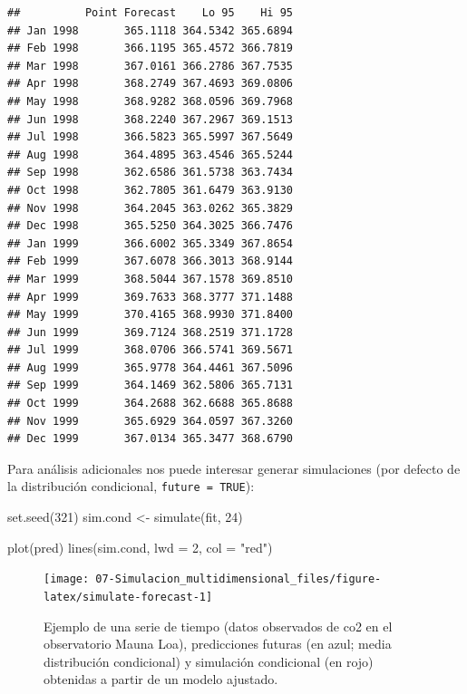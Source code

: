 \documentclass[
]{book}
\newenvironment{Shaded}{\begin{snugshade}}{\end{snugshade}}
\newcommand{\AttributeTok}[1]{\textcolor[rgb]{0.77,0.63,0.00}{#1}}
\newcommand{\DecValTok}[1]{\textcolor[rgb]{0.00,0.00,0.81}{#1}}
\newcommand{\FunctionTok}[1]{\textcolor[rgb]{0.00,0.00,0.00}{#1}}
\newcommand{\NormalTok}[1]{#1}
\newcommand{\OtherTok}[1]{\textcolor[rgb]{0.56,0.35,0.01}{#1}}
\newcommand{\StringTok}[1]{\textcolor[rgb]{0.31,0.60,0.02}{#1}}
\theoremstyle{break}
\theoremstyle{definition}
\theoremstyle{definition}
\theoremstyle{definition}
\theoremstyle{definition}
\theoremstyle{remark}
\begin{document}
\begin{verbatim}
##          Point Forecast    Lo 95    Hi 95
## Jan 1998       365.1118 364.5342 365.6894
## Feb 1998       366.1195 365.4572 366.7819
## Mar 1998       367.0161 366.2786 367.7535
## Apr 1998       368.2749 367.4693 369.0806
## May 1998       368.9282 368.0596 369.7968
## Jun 1998       368.2240 367.2967 369.1513
## Jul 1998       366.5823 365.5997 367.5649
## Aug 1998       364.4895 363.4546 365.5244
## Sep 1998       362.6586 361.5738 363.7434
## Oct 1998       362.7805 361.6479 363.9130
## Nov 1998       364.2045 363.0262 365.3829
## Dec 1998       365.5250 364.3025 366.7476
## Jan 1999       366.6002 365.3349 367.8654
## Feb 1999       367.6078 366.3013 368.9144
## Mar 1999       368.5044 367.1578 369.8510
## Apr 1999       369.7633 368.3777 371.1488
## May 1999       370.4165 368.9930 371.8400
## Jun 1999       369.7124 368.2519 371.1728
## Jul 1999       368.0706 366.5741 369.5671
## Aug 1999       365.9778 364.4461 367.5096
## Sep 1999       364.1469 362.5806 365.7131
## Oct 1999       364.2688 362.6688 365.8688
## Nov 1999       365.6929 364.0597 367.3260
## Dec 1999       367.0134 365.3477 368.6790
\end{verbatim}

Para análisis adicionales nos puede interesar generar simulaciones (por defecto de la distribución condicional, \texttt{future\ =\ TRUE}):

\begin{Shaded}
\begin{Highlighting}[]
\FunctionTok{set.seed}\NormalTok{(}\DecValTok{321}\NormalTok{)}
\NormalTok{sim.cond }\OtherTok{\textless{}{-}} \FunctionTok{simulate}\NormalTok{(fit, }\DecValTok{24}\NormalTok{)}

\FunctionTok{plot}\NormalTok{(pred)}
\FunctionTok{lines}\NormalTok{(sim.cond, }\AttributeTok{lwd =} \DecValTok{2}\NormalTok{, }\AttributeTok{col =} \StringTok{"red"}\NormalTok{)}
\end{Highlighting}
\end{Shaded}

\begin{figure}[!htb]

{\centering \texttt{[image: 07-Simulacion\_multidimensional\_files/figure-latex/simulate-forecast-1]} 

}

\caption{Ejemplo de una serie de tiempo (datos observados de co2 en el observatorio Mauna Loa), predicciones futuras (en azul; media distribución condicional) y simulación condicional (en rojo) obtenidas a partir de un modelo ajustado.}\label{fig:simulate-forecast}
\end{figure}
\end{document}
